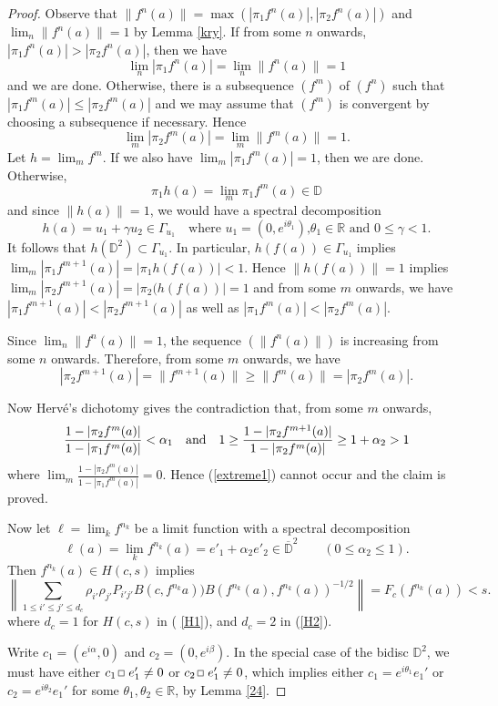 \documentclass[12pt, twoside]{article}
\def\sqr#1#2{{\,\vcenter{\vbox{\hrule height.#2pt\hbox{\vrule width.#2pt
height#1pt \kern#1pt\vrule width.#2pt}\hrule height.#2pt}}\,}}
\def\bo{\sqr44\,}
\theoremstyle{definition}
\numberwithin{equation}{section}
\begin{document}
\begin{proof}
Observe that $\|f^n(a)\|= \max (|\pi_1 f^n(a)|, |\pi_2 f^n(a)|)$ and $\lim_n \|f^n(a)\|=1$ by Lemma \ref{kry}.
If from some $n$ onwards, $|\pi_1 f^n(a)| > |\pi_2 f^n(a)|$, then we have
$$\lim_n |\pi_1 f^n(a)| = \lim_n \|f^n(a)\|=1$$
and we are done. Otherwise, there is a subsequence $(f^m)$ of $(f^n)$ such that $|\pi_1 f^m(a)| \leq |\pi_2 f^m(a)|$
and we may assume that $(f^m)$ is convergent by choosing a subsequence if necessary. Hence
$$\lim_m |\pi_2 f^m(a)| = \lim_m \|f^m(a)\|=1.$$
Let $h = \lim_m f^m$.
If we also have $\lim_m |\pi_1f^m(a)|=1$, then we are done. Otherwise,
\begin{equation}\label{extreme1}
\pi_1 h (a) = \lim_m\pi_1 f^m(a) \in \mathbb{D}
\end{equation}
and since $\|h(a)\|=1$, we would have a spectral decomposition
$$h (a) = u_1 + \gamma u_2 \in \Gamma_{u_1} \quad \mbox{where $u_1 = (0, e^{i\theta_1})$,
$\theta_1 \in \mathbb{R}$ and $0\leq \gamma <1$}.$$
It follows that $h(\mathbb{D}^2) \subset \Gamma_{u_1}$. In particular, $h(f(a)) \in  \Gamma_{u_1}$ implies
$\lim_m |\pi_1f^{m+1}(a)| = |\pi_1 h(f(a))| <1$. Hence $\|h(f(a))\|=1$ implies $\lim_m|\pi_2 f^{m+1}(a) | = |\pi_2(h(f(a))| =1$
 and from some $m$ onwards, we have $|\pi_1 f^{m+1}(a)| < |\pi_2f^{m+1}(a)|$ as well as
 $|\pi_1 f^{m}(a)| < |\pi_2f^{m}(a)|$.

Since $\lim_n \|f^n(a)\|=1$, the sequence $(\|f^n(a)\|)$ is increasing from some $n$ onwards. Therefore, from some
$m$ onwards, we have
$$|\pi_2 f^{m+1}(a)| =\|f^{m+1}(a)\| \geq \|f^{m}(a)\| =|\pi_2 f^m(a)|.$$

Now Herv\'e's dichotomy gives the contradiction that, from some $m$ onwards,
$$\frac{1-|\pi_2f^m(a)|}{1-|\pi_1 f^m(a)|}<\alpha_1\quad {\rm and} \quad
1\geq \frac{1-|\pi_2f^{m+1}(a)|}{1-|\pi_2 f^m(a)|}\geq 1+\alpha_2 >1$$
where $\lim_m \frac{1-|\pi_2f^m(a)|}{1-|\pi_1 f^m(a)|}=0$.
Hence (\ref{extreme1}) cannot occur and  the claim is proved.

Now let $\ell=\lim_k f^{n_k}$ be a limit function with a spectral decomposition
$$\ell(a) = \lim_k f^{n_k}(a) = e'_1 + \alpha_2 e'_2 \in \overline{\mathbb{D}}^2 \qquad (0\leq \alpha_2 \leq 1).$$
Then $f^{n_k}(a) \in H(c, s)$ implies
$$\left\|\sum_{1\leq i'\leq j'\leq d_c}\rho_{i'}\rho_{j'}P_{i'j'}B(c,f^{n_k}a))B(f^{n_k}(a),f^{n_k}(a))^{-1/2}\right\|
=F_c(f^{n_k}(a) ) <s.$$
where $d_c =1$ for $H(c,s)$ in ( \ref{H1}), and $d_c =2$ in  (\ref{H2}).

Write $c_1=(e^{i\alpha},0)$ and $c_2 = (0, e^{i\beta})$. In the special case of the bidisc $\mathbb{D}^2$, we must have
either $c_1 \bo e_1' \neq 0$ or $c_2 \bo e_1' \neq 0$, which implies either $c_1 = e^{i\theta_1} e_1'$ or
$c_2 = e^{i\theta_2}e_1'$ for some $\theta_1, \theta_2 \in \mathbb{R}$, by Lemma \ref{24}.


\end{proof}
\end{document}
